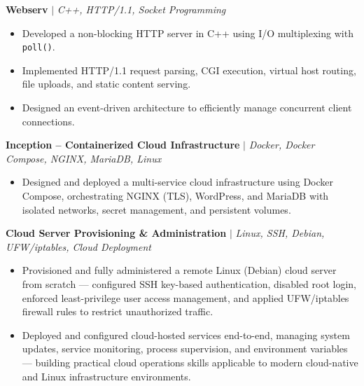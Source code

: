 \documentclass[9.5pt, a4paper]{article}
\begin{document}
\vspace{2pt}
{\small\textbf{Webserv} $|$ \textit{C++, HTTP/1.1, Socket Programming}}
\begin{itemize}\small
  \item Developed a non-blocking HTTP server in C++ using I/O multiplexing with \texttt{poll()}.
  \item Implemented HTTP/1.1 request parsing, CGI execution, virtual host routing, file uploads, and static content serving.
  \item Designed an event-driven architecture to efficiently manage concurrent client connections.
\end{itemize}

\vspace{2pt}
{\small\textbf{Inception -- Containerized Cloud Infrastructure} $|$ \textit{Docker, Docker Compose, NGINX, MariaDB, Linux}}
\begin{itemize}\small
  \item Designed and deployed a multi-service cloud infrastructure using Docker Compose, orchestrating NGINX (TLS), WordPress, and MariaDB with isolated networks, secret management, and persistent volumes.
\end{itemize}

\vspace{2pt}
{\small\textbf{Cloud Server Provisioning \& Administration} $|$ \textit{Linux, SSH, Debian, UFW/iptables, Cloud Deployment}}
\begin{itemize}\small
  \item Provisioned and fully administered a remote Linux (Debian) cloud server from scratch — configured SSH key-based authentication, disabled root login, enforced least-privilege user access management, and applied UFW/iptables firewall rules to restrict unauthorized traffic.
  \item Deployed and configured cloud-hosted services end-to-end, managing system updates, service monitoring, process supervision, and environment variables — building practical cloud operations skills applicable to modern cloud-native and Linux infrastructure environments.
\end{itemize}

\end{document}
